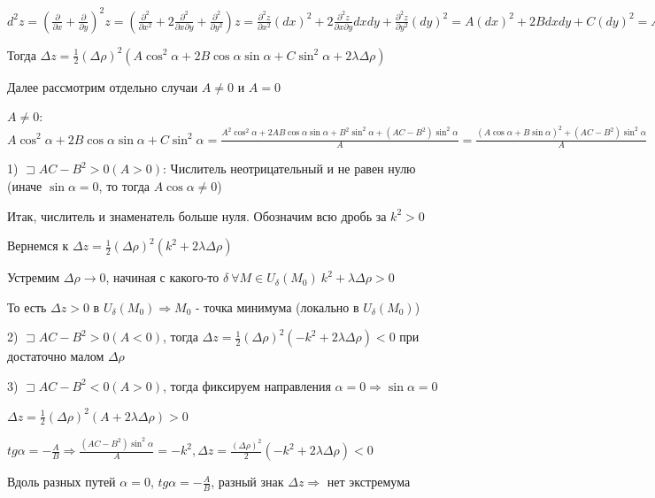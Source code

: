 \documentclass[12pt]{article}
\begin{document}
    $d^2 z = \left(\frac{\partial}{\partial x} + \frac{\partial}{\partial y}\right)^2 z = \left(\frac{\partial^2}{\partial x^2} + 2 \frac{\partial^2}{\partial x \partial y} + \frac{\partial^2}{\partial y^2}\right) z =
    \frac{\partial^2 z}{\partial x^2} (dx)^2 + 2 \frac{\partial^2 z}{\partial x \partial y} dxdy + \frac{\partial^2 z}{\partial y^2} (dy)^2 = A (dx)^2 + 2B dxdy + C(dy)^2 =
    A(\Delta \rho)^2 \cos^2\alpha + 2B (\Delta \rho)^2 \cos\alpha\sin\alpha + C(\Delta \rho)^2 \sin^2\alpha$

    Тогда $\Delta z = \frac{1}{2} (\Delta \rho)^2 (A\cos^2\alpha + 2B\cos\alpha\sin\alpha + C\sin^2\alpha + 2\lambda \Delta \rho)$

    Далее рассмотрим отдельно случаи $A \neq 0$ и $A = 0$

    $A \neq 0$: $A\cos^2\alpha + 2B\cos\alpha\sin\alpha + C\sin^2\alpha = \frac{A^2\cos^2\alpha + 2AB\cos\alpha\sin\alpha + B^2\sin^2\alpha + (AC - B^2)\sin^2\alpha}{A} =
    \frac{(A\cos\alpha + B\sin\alpha)^2 + (AC - B^2)\sin^2\alpha}{A}$

    1) $\sqsupset AC - B^2 > 0 (A > 0)$: Числитель неотрицательный и не равен нулю (иначе $\sin\alpha = 0$, то тогда $A\cos\alpha \neq 0$)

    Итак, числитель и знаменатель больше нуля. Обозначим всю дробь за $k^2 > 0$

    Вернемся к $\Delta z = \frac{1}{2}(\Delta \rho)^2 (k^2 + 2\lambda\Delta\rho)$

    Устремим $\Delta \rho \rightarrow 0$, начиная с какого-то $\delta \ \forall M \in U_\delta(M_0) \ k^2 + \lambda\Delta\rho > 0$

    То есть $\Delta z > 0$ в $U_\delta(M_0) \Longrightarrow M_0$ - точка минимума (локально в $U_\delta(M_0)$)

    2) $\sqsupset AC - B^2 > 0 (A < 0)$, тогда $\Delta z = \frac{1}{2}(\Delta \rho)^2 (-k^2 + 2\lambda\Delta\rho) < 0$ при достаточно малом $\Delta \rho$

    3) $\sqsupset AC - B^2 < 0 (A > 0)$, тогда фиксируем направления $\alpha = 0 \Longrightarrow \sin\alpha = 0$

    $\Delta z = \frac{1}{2}(\Delta \rho)^2 (A + 2\lambda\Delta\rho) > 0$

    $tg \alpha = -\frac{A}{B} \Longrightarrow \frac{(AC - B^2)\sin^2\alpha}{A} = -k^2, \Delta z = \frac{(\Delta \rho)^2}{2}(-k^2 + 2\lambda\Delta\rho) < 0$

    Вдоль разных путей $\alpha = 0$, $tg \alpha = -\frac{A}{B}$, разный знак $\Delta z \Longrightarrow$ нет экстремума
\end{document}
